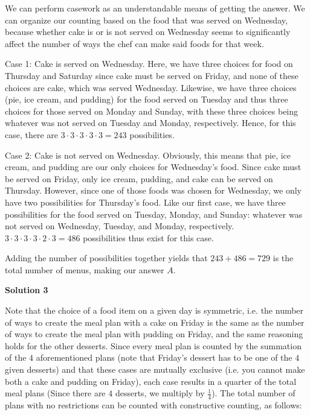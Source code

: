 \begin{enumerate}
We can perform casework as an understandable means of getting the answer. We can organize our counting based on the food that was served on Wednesday, because whether cake is or is not served on Wednesday seems to significantly affect the number of ways the chef can make said foods for that week.

 Case 1: Cake is served on Wednesday. Here, we have three choices for food on Thursday and Saturday since cake must be served on Friday, and none of these choices are cake, which was served Wednesday. Likewise, we have three choices (pie, ice cream, and pudding) for the food served on Tuesday and thus three choices for those served on Monday and Sunday, with these three choices being whatever was not served on Tuesday and Monday, respectively. Hence, for this case, there are $3 \cdot 3 \cdot 3 \cdot 3 \cdot 3 = 243$ possibilities.

 Case 2: Cake is not served on Wednesday. Obviously, this means that pie, ice cream, and pudding are our only choices for Wednesday's food. Since cake must be served on Friday, only ice cream, pudding, and cake can be served on Thursday. However, since one of those foods was chosen for Wednesday, we only have two possibilities for Thursday's food. Like our first case, we have three possibilities for the food served on Tuesday, Monday, and Sunday: whatever was not served on Wednesday, Tuesday, and Monday, respectively. $3 \cdot 3 \cdot 3 \cdot 3 \cdot 2 \cdot 3 = 486$ possibilities thus exist for this case.

 Adding the number of possibilities together yields that $243 + 486 = 729$ is the total number of menus, making our answer $\boxed{A}$.

 



\textbf{Solution 3}

Note that the choice of a food item on a given day is symmetric, i.e. the number of ways to create the meal plan with a cake on Friday is the same as the number of ways to create the meal plan with pudding on Friday, and the same reasoning holds for the other desserts. Since every meal plan is counted by the summation of the $4$ aforementioned plans (note that Friday's dessert has to be one of the $4$ given desserts) and that these cases are mutually exclusive (i.e. you cannot make both a cake and pudding on Friday), each case results in a quarter of the total meal plans (Since there are $4$ desserts, we multiply by $\frac{1}{4}$). The total number of plans with no restrictions can be counted with constructive counting, as follows:


\end{enumerate}

